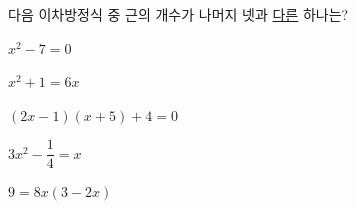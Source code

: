 다음 이차방정식 중 근의 개수가 나머지 넷과 \underline{다른} 하나는?
\begin{choicesii}{\rule[-3ex]{0pt}{8ex}$x^2-7=0$}{\rule[-3ex]{0pt}{8ex}$x^2+1=6x$}{\rule[-3ex]{0pt}{8ex}$(2x-1)(x+5)+4=0$}{\rule[-3ex]{0pt}{8ex}$3x^2-\dfrac{1}{4}=x$}{\rule[-3ex]{0pt}{8ex}$9=8x(3-2x)$}\end{choicesii}
